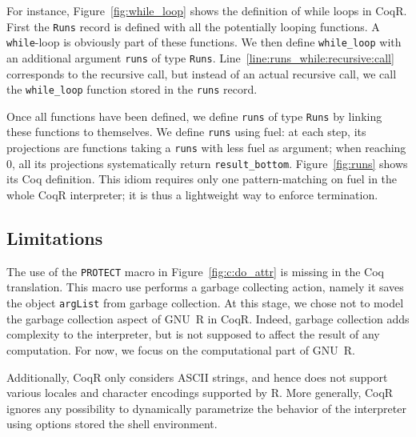 \documentclass[
    sigplan,
    10pt,
    review, %
    natbib=false %
 ]{acmart}
\newcommand\mb[1]{\todo[color=purple!20,size=\scriptsize]{#1}}
\newcommand\mbi[1]{\todo[color=purple!20,inline]{#1}}
\newcommand\CoqR{CoqR}
\begin{document}
For instance, Figure~\ref{fig:while_loop} shows the definition
of while loops in \CoqR{}.
First the \texttt{Runs} record is defined
with all the potentially looping functions.
A \texttt{while}-loop is obviously part of these functions.
We then define \texttt{while_loop} with an additional
argument \texttt{runs} of type \texttt{Runs}.
Line~\ref{line:runs_while:recursive:call} corresponds to the recursive call,
but instead of an actual recursive call,
we call the \texttt{while_loop} function stored
in the \texttt{runs} record.

Once all functions have been defined,
we define \texttt{runs} of type \texttt{Runs}
by linking these functions to themselves.
We define \texttt{runs} using fuel:
at each step, its projections are functions taking a \texttt{runs}
with less fuel as argument;
when reaching \(0\), all its projections systematically return \texttt{result_bottom}.
Figure~\ref{fig:runs} shows its Coq definition.
%
This idiom requires only one pattern-matching on fuel in the whole \CoqR{} interpreter;
it is thus a lightweight way to enforce termination.


\subsection{Limitations}
The use of the \texttt{PROTECT} macro in Figure~\ref{fig:c:do_attr} is missing in the Coq translation. This macro use performs a garbage collecting action, namely it saves the object \texttt{argList} from garbage collection.
At this stage, we chose not to model the garbage collection aspect of GNU~R in \CoqR{}. Indeed, garbage collection adds complexity to the interpreter, but is not supposed to affect the result of any computation. For now, we focus on the computational part of GNU~R.

Additionally, \CoqR{} only considers ASCII strings, and hence does not support various locales and character encodings supported by R.
More generally, \CoqR{} ignores any possibility to dynamically
parametrize the behavior of the interpreter using options
stored the shell environment.
\end{document}

